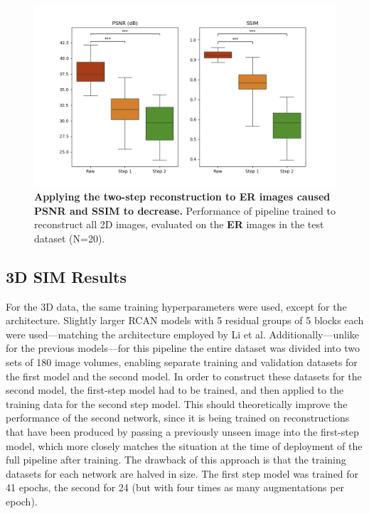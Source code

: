 \documentclass[12pt]{article}
\begin{document}
\begin{figure}[hbt]
    \includegraphics[scale=0.72, center]{figures/boxplot_2d_0.png}
    \caption{\textbf{Applying the two-step reconstruction to ER images caused PSNR and SSIM to decrease.}
    Performance of pipeline trained to reconstruct all 2D images, evaluated on the \textbf{ER} images in the test dataset (N=20).}
    \label{fig:m023_m024_488_pipeline_stats}
\end{figure}


\subsection{3D SIM Results}

For the 3D data, the same training hyperparameters were used, except for the architecture.
Slightly larger RCAN models with 5 residual groups of 5 blocks each were used---matching the architecture employed by Li et al.
Additionally---unlike for the previous models---for this pipeline the entire dataset was divided into two sets of 180 image volumes,
enabling separate training and validation datasets for the first model and the second model.
In order to construct these datasets for the second model, the first-step model had to be trained,
and then applied to the training data for the second step model.
This should theoretically improve the performance of the second network,
since it is being trained on reconstructions that have been produced by passing a previously unseen image into the first-step model,
which more closely matches the situation at the time of deployment of the full pipeline after training.
The drawback of this approach is that the training datasets for each network are halved in size.
The first step model was trained for 41 epochs, the second for 24 (but with four times as many augmentations per epoch).
\end{document}
